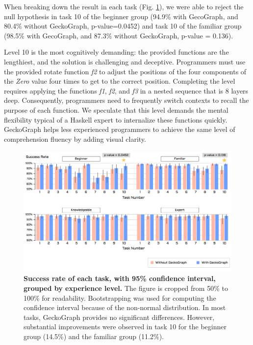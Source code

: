 \documentclass[preprint,12pt]{elsarticle}
\begin{document}
When breaking down the result in each task (Fig. \ref{fig:success-rate}), we were able to reject the null hypothesis in task 10 of the beginner group (94.9\% with GecoGraph, and 80.4\% without GeckoGraph, p-value=0.0452) and task 10 of the familiar group (98.5\% with GecoGraph, and 87.3\% without GeckoGraph, p-value = 0.136). 

Level 10 is the most cognitively demanding: the provided functions are the lengthiest, and the solution is challenging and deceptive. Programmers must use the provided rotate function {\it f2} to adjust the positions of the four components of the {\it Zero} value four times to get to the correct position. Completing the level requires applying the functions {\it f1}, {\it f2}, and {\it f3} in a nested sequence that is 8 layers deep. Consequently, programmers need to frequently switch contexts to recall the purpose of each function. We speculate that this level demands the mental flexibility typical of a Haskell expert to internalize these functions quickly. GeckoGraph helps less experienced programmers to achieve the same level of comprehension fluency by adding visual clarity.

\begin{figure}[ht]
  \includegraphics[width=\linewidth]{figures/SuccessfulRate}
  \caption{\label{fig:success-rate}{\bf Success rate of each task, with 95\% confidence interval, grouped by experience level.} The figure is cropped from 50\% to 100\% for readability. Bootstrapping was used for computing the confidence interval because of the non-normal distribution. In most tasks, GeckoGraph provides no significant differences. However, substantial improvements were observed in task 10 for the beginner group (14.5\%) and the familiar group (11.2\%). }
\end{figure}
\end{document}
